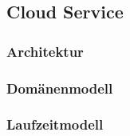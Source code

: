
\subsection{Cloud Service}\label{subsec:cloud-service}

\subsubsection{Architektur}

\subsubsection{Domänenmodell}

\subsubsection{Laufzeitmodell}

\clearpage
